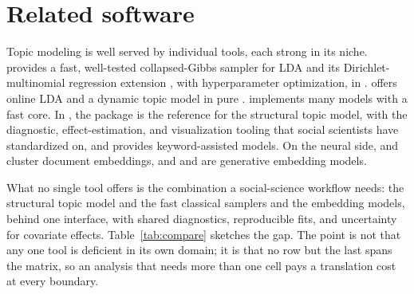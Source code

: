 \documentclass[article,nojss]{jss}
\begin{document}
\section{Related software}\label{sec:related}

Topic modeling is well served by individual tools, each strong in its niche.
 \citep{mccallum2002mallet} provides a fast, well-tested
collapsed-Gibbs sampler for LDA and its Dirichlet-multinomial regression
extension \citep{mimno2008dmr}, with hyperparameter optimization, in
.  \citep{rehurek2010gensim} offers online LDA and a
dynamic topic model in pure .  \citep{tomotopy}
implements many models with a fast  core. In , the
 package \citep{roberts2019stm} is the reference for the structural
topic model, with the diagnostic, effect-estimation, and visualization tooling
that social scientists have standardized on, and 
\citep{eshima2024keyatm} provides keyword-assisted models. On the neural side,
 \citep{grootendorst2022bertopic} and 
\citep{angelov2020top2vec} cluster document embeddings, and 
\citep{dieng2020etm} and  \citep{wu2024fastopic} are generative
embedding models.

What no single tool offers is the combination a social-science workflow needs:
the structural topic model and the fast classical samplers and the embedding
models, behind one interface, with shared diagnostics, reproducible fits, and
uncertainty for covariate effects. Table~\ref{tab:compare} sketches the
gap. The point is not that any one tool is deficient in its own domain; it is
that no row but the last spans the matrix, so an analysis that needs more than
one cell pays a translation cost at every boundary.
\end{document}
